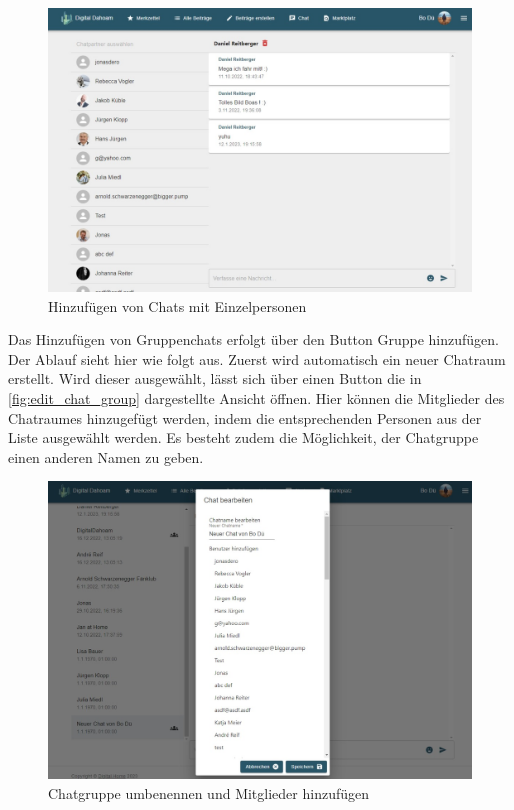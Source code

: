 \begin{figure}[!htb]
  \centering
  \includegraphics[width=.9\textwidth]{figures/boas/21_new_chat.jpeg}
  \caption[]{Hinzufügen von Chats mit Einzelpersonen}
  \label{fig:new_personal_chat}
\end{figure}

Das Hinzufügen von Gruppenchats erfolgt über den Button \glqq Gruppe hinzufügen\grqq. Der Ablauf sieht hier wie folgt aus. Zuerst wird automatisch ein neuer Chatraum erstellt. Wird dieser ausgewählt, lässt sich über einen Button die in \autoref{fig:edit_chat_group} dargestellte Ansicht öffnen. Hier können die Mitglieder des Chatraumes hinzugefügt werden, indem die entsprechenden Personen aus der Liste ausgewählt werden. Es besteht zudem die Möglichkeit, der Chatgruppe einen anderen Namen zu geben.

\begin{figure}[!htb]
  \centering
  \includegraphics[width=.9\textwidth]{figures/boas/21_edit_chat_group.jpeg}
  \caption[]{Chatgruppe umbenennen und Mitglieder hinzufügen}
  \label{fig:edit_chat_group}
\end{figure}

